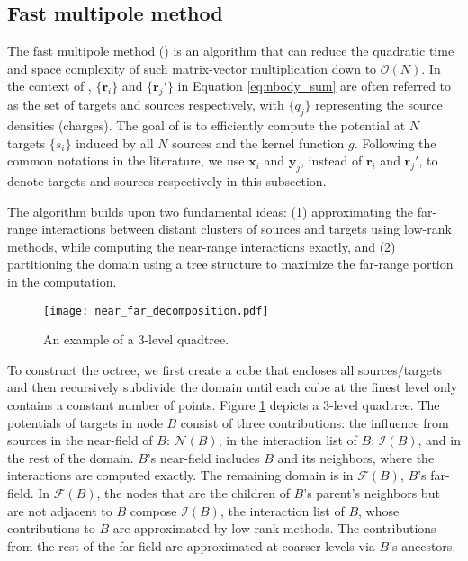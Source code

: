 \subsection{Fast multipole method}

The fast multipole method (\fmm) is an algorithm that can reduce the quadratic time and space complexity of such matrix-vector multiplication down to $\mathcal{O}(N)$.
In the context of \fmm, $\{\mathbf{r}_i\}$ and $\{\mathbf{r}_j'\}$ in Equation \ref{eq:nbody_sum} are often referred to as the set of targets and sources respectively, with $\{q_j\}$ representing the source densities (charges).
The goal of \fmm is to efficiently compute the potential at $N$ targets $\{s_i\}$ induced by all $N$ sources and the kernel function $g$.
Following the common notations in the literature, we use $\mathbf{x}_i$ and $\mathbf{y}_j$, instead of $\mathbf{r}_i$ and $\mathbf{r}_j'$, to denote targets and sources respectively in this subsection.

The \fmm algorithm builds upon two fundamental ideas: (1) approximating the far-range interactions between distant clusters of sources and targets using low-rank methods, while computing the near-range interactions exactly, and (2) partitioning the domain using a tree structure to maximize the far-range portion in the computation.

\begin{figure}
    \centering
    \texttt{[image: near\_far\_decomposition.pdf]}
    \caption{An example of a 3-level quadtree.}
    \label{fig:near_far_decomp}
\end{figure}

To construct the octree, we first create a cube that encloses all sources/targets and then recursively subdivide the domain until each cube at the finest level only contains a constant number of points.
Figure \ref{fig:near_far_decomp} depicts a 3-level quadtree.
The potentials of targets in node $B$ consist of three contributions: the influence from sources in the near-field of $B$: $\mathcal{N}(B)$, in the interaction list of $B$: $\mathcal{I}(B)$, and in the rest of the domain.
$B$'s near-field includes $B$ and its neighbors, where the interactions are computed exactly.
The remaining domain is in $\mathcal{F}(B)$, $B$'s far-field.
In $\mathcal{F}(B)$, the nodes that are the children of $B$'s parent's neighbors but are not adjacent to $B$ compose $\mathcal{I}(B)$, the interaction list of $B$, whose contributions to $B$ are approximated by low-rank methods.
The contributions from the rest of the far-field are approximated at coarser levels via $B$'s ancestors.

